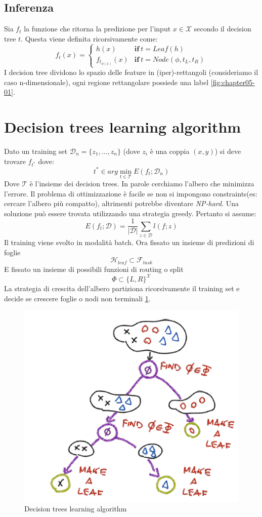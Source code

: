 	\subsection{Inferenza}
	Sia $f_t$ la funzione che ritorna la predizione per l'input $x\in\mathcal{X}$ secondo il decision tree $t$.
	Questa viene definita ricorsivamente come:
	$$f_t(x)=\begin{cases}h(x)&\mathbf{if}\ t = Leaf(h)\\
		f_{t_{\phi(x)}}(x)&\mathbf{if}\ t = Node(\phi, t_L, t_R)
	\end{cases}$$
	I decision tree dividono lo spazio delle feature in (iper)-rettangoli (consideriamo il caso n-dimensionale), ogni regione rettangolare possiede una label \ref{fig:chapter05-01}.

\section{Decision trees learning algorithm}
Dato un training set $\mathcal{D}_n = \{z_1,\dots, z_n\}$ (dove $z_i$ \`e una coppia $(x,y)$) si deve trovare $f_{t^*}$ dove:
$$t^*\in arg\min\limits_{t\in\mathcal{T}} E(f_t;\mathcal{D}_n)$$
Dove $\mathcal{T}$ \`e l'insieme dei decision trees. 
In parole cerchiamo l'albero che minimizza l'errore.
Il problema di ottimizzazione \`e facile se non si impongono constraints(es: cercare l'albero più compatto), altrimenti potrebbe diventare \emph{NP-hard}.
Una soluzione pu\`o essere trovata utilizzando una strategia greedy.
Pertanto si assume:
$$E(f_t;\mathcal{D}) = \dfrac{1}{|\mathcal{D}|}\sum\limits_{z\in\mathcal{D}}l(f;z)$$
Il training viene svolto in modalit\`a batch.
Ora fissato un insieme di predizioni di foglie
$$\mathcal{H}_{leaf}\subset\mathcal{F}_{task}$$
E fissato un insieme di possibili funzioni di routing o split
$$\Phi\subset\{L,R\}^\mathcal{X}$$
La strategia di crescita dell'albero partiziona ricorsivamente il training set e decide se crescere foglie o nodi non terminali \ref{fig:chapter05-02}. 

\begin{figure}
	\centering
	\includegraphics[width=0.4\linewidth]{imgs/chapter5/img2}
	\caption{Decision trees learning algorithm}
	\label{fig:chapter05-02}
\end{figure}


